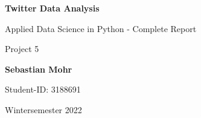 \documentclass[a4paper,10pt]{scrreprt}
\begin{document}
\begin{titlepage}
    \begin{center}
        \vspace*{3cm}
 
        \Huge
        \textbf{Twitter Data Analysis}
 
        \vspace{0.5cm}
        \LARGE
        Applied Data Science in Python - Complete Report

        \vspace{0.5cm}

        \large
        Project 5

        \vspace{1.5cm}
 
        \textbf{Sebastian Mohr}\\

        \vspace{1cm}

        \large 
        Student-ID: 3188691

        \vspace{0.5cm}

        Wintersemester 2022
	\vspace{\fill}
    \end{center}
\end{titlepage}
\end{document}
